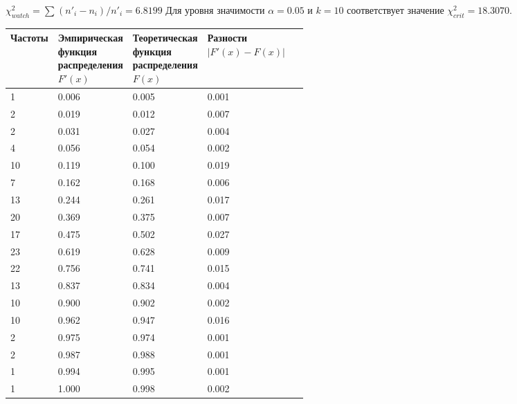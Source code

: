 $\chi^2_{watch} = \sum_{}^{} (n{}'_{i} - n_{i}) / n{}'_{i} = 6.8199$ Для уровня значимости $\alpha = 0.05$ и $k = 10$ соответствует значение $\chi^2_{crit} = 18.3070$.

\begin{table}[H]
    \begin{center}
        \begin{tabular}{|l|p{0.25\linewidth}|p{0.25\linewidth}|l|}
            \hline
            Частоты & Эмпирическая функция распределения $F{}'(x)$ & Теоретическая функция распределения $F(x)$
            & Разности $\left| F{}'(x) - F(x) \right|$
            \\
            \hline
            1  & 0.006 & 0.005 & 0.001 \\
            \hline
            2  & 0.019 & 0.012 & 0.007 \\
            \hline
            2  & 0.031 & 0.027 & 0.004 \\
            \hline
            4  & 0.056 & 0.054 & 0.002 \\
            \hline
            10 & 0.119 & 0.100 & 0.019 \\
            \hline
            7  & 0.162 & 0.168 & 0.006 \\
            \hline
            13 & 0.244 & 0.261 & 0.017 \\
            \hline
            20 & 0.369 & 0.375 & 0.007 \\
            \hline
            17 & 0.475 & 0.502 & 0.027 \\
            \hline
            23 & 0.619 & 0.628 & 0.009 \\
            \hline
            22 & 0.756 & 0.741 & 0.015 \\
            \hline
            13 & 0.837 & 0.834 & 0.004 \\
            \hline
            10 & 0.900 & 0.902 & 0.002 \\
            \hline
            10 & 0.962 & 0.947 & 0.016 \\
            \hline
            2  & 0.975 & 0.974 & 0.001 \\
            \hline
            2  & 0.987 & 0.988 & 0.001 \\
            \hline
            1  & 0.994 & 0.995 & 0.001 \\
            \hline
            1  & 1.000 & 0.998 & 0.002 \\
            \hline
        \end{tabular}
    \end{center}
\end{table}

